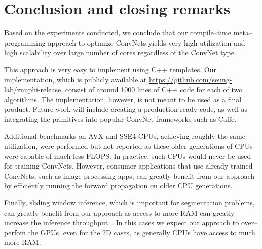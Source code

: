 \section{Conclusion and closing remarks}

  Based on the experiments conducted, we conclude that our
  compile--time meta--programming approach to optimize ConvNets yields
  very high utilization and high scalability over large number of
  cores regardless of the ConvNet type.

  This approach is very easy to implement using C++ templates.  Our
  implementation, which is publicly available at
  \url{https://github.com/seung-lab/znnphi-release}, consist of around
  1000 lines of C++ code for each of two algorithms.  The
  implementation, however, is not meant to be used as a final product.
  Future work will include creating a production ready code, as well
  as integrating the primitives into popular ConvNet frameworks such
  as Caffe.

  Additional benchmarks on AVX and SSE4 CPUs, achieving roughly the
  same utilization, were performed but not reported as these older
  generations of CPUs were capable of much less FLOPS.  In practice,
  such CPUs would never be used for training ConvNets.  However,
  consumer applications that use already trained ConvNets, such as
  image processing apps, can greatly benefit from our approach by
  efficiently running the forward propagation on older CPU
  generations.

  Finally, sliding window inference, which is important for
  segmentation problems, can greatly benefit from our approach as
  access to more RAM can greatly increase the inference
  throughput~\cite{zlateski2016znni}.  In this cases we expect our
  approach to over--perfom the GPUs, even for the 2D cases, as
  generally CPUs have access to much more RAM.
